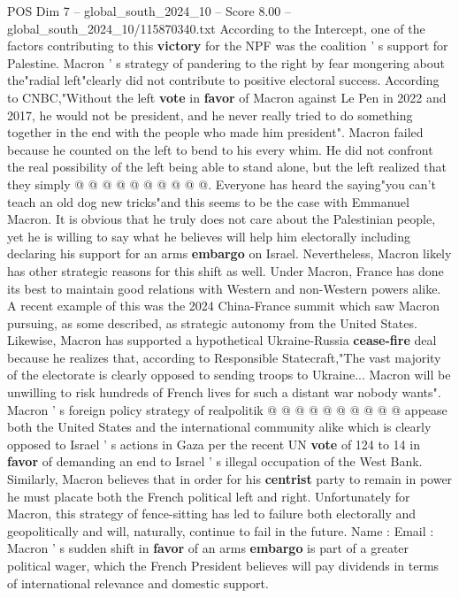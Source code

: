 \begin{textsample}{POS Dim 7 – global\_south\_2024\_10 – Score 8.00 – global\_south\_2024\_10/115870340.txt}
According to the Intercept, one of the factors contributing to this \textbf{victory} for the NPF was the coalition ' s support for Palestine.
Macron ' s strategy of pandering to the right by fear mongering about the"radial left"clearly did not contribute to positive electoral success.
According to CNBC,"Without the left \textbf{vote} in \textbf{favor} of Macron against Le Pen in 2022 and 2017, he would not be president, and he never really tried to do something together in the end with the people who made him president".
Macron failed because he counted on the left to bend to his every whim.
He did not confront the real possibility of the left being able to stand alone, but the left realized that they simply @ @ @ @ @ @ @ @ @ @.
Everyone has heard the saying"you can't teach an old dog new tricks"and this seems to be the case with Emmanuel Macron.
It is obvious that he truly does not care about the Palestinian people, yet he is willing to say what he believes will help him electorally including declaring his support for an arms \textbf{embargo} on Israel.
Nevertheless, Macron likely has other strategic reasons for this shift as well.
Under Macron, France has done its best to maintain good relations with Western and non-Western powers alike.
A recent example of this was the 2024 China-France summit which saw Macron pursuing, as some described, as strategic autonomy from the United States.
Likewise, Macron has supported a hypothetical Ukraine-Russia \textbf{cease-fire} deal because he realizes that, according to Responsible Statecraft,"The vast majority of the electorate is clearly opposed to sending troops to Ukraine...
Macron will be unwilling to risk hundreds of French lives for such a distant war nobody wants".
Macron ' s foreign policy strategy of realpolitik @ @ @ @ @ @ @ @ @ @ appease both the United States and the international community alike which is clearly opposed to Israel ' s actions in Gaza per the recent UN \textbf{vote} of 124 to 14 in \textbf{favor} of demanding an end to Israel ' s illegal occupation of the West Bank.
Similarly, Macron believes that in order for his \textbf{centrist} party to remain in power he must placate both the French political left and right.
Unfortunately for Macron, this strategy of fence-sitting has led to failure both electorally and geopolitically and will, naturally, continue to fail in the future.
Name : Email : Macron ' s sudden shift in \textbf{favor} of an arms \textbf{embargo} is part of a greater political wager, which the French President believes will pay dividends in terms of international relevance and domestic support.

\end{textsample}
